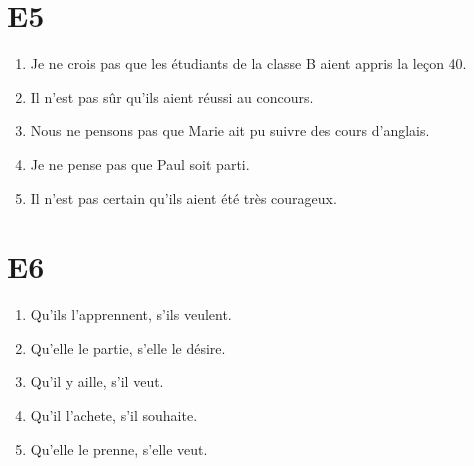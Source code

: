 \documentclass{book}
\begin{document}
    \section{E5}
        \begin{enumerate}
            \item Je ne crois pas que les étudiants de la classe B aient appris la leçon 40.
            \item Il n'est pas sûr qu'ils aient réussi au concours.
            \item Nous ne pensons pas que Marie ait pu suivre des cours d'anglais.
            \item Je ne pense pas que Paul soit parti.
            \item Il n'est pas certain qu'ils aient été très courageux.
        \end{enumerate}

    \section{E6}
        \begin{enumerate}
            \item Qu'ils l'apprennent, s'ils veulent.
            \item Qu'elle le partie, s'elle le désire.
            \item Qu'il y aille, s'il veut.
            \item Qu'il l'achete, s'il souhaite.
            \item Qu'elle le prenne, s'elle veut.
        \end{enumerate}
\end{document}
